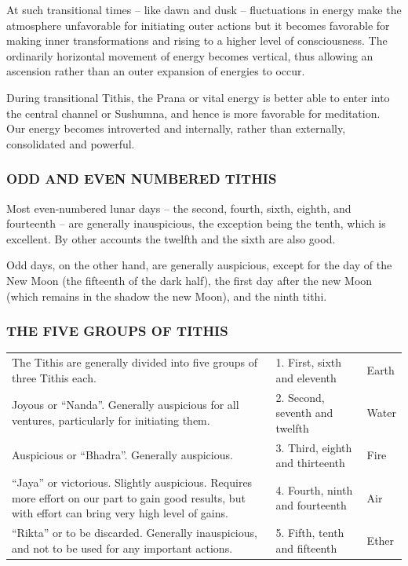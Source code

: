  

At such transitional times – like dawn and dusk – fluctuations in energy make the atmosphere unfavorable for initiating outer actions but it becomes favorable for making inner transformations and rising to a higher level of consciousness. The ordinarily horizontal movement of energy becomes vertical, thus allowing an ascension rather than an outer expansion of energies to occur.

 

During transitional Tithis, the Prana or vital energy is better able to enter into the central channel or Sushumna, and hence is more favorable for meditation. Our energy becomes introverted and internally, rather than externally, consolidated and powerful.

 

\subsubsection{ODD AND EVEN NUMBERED TITHIS}

Most even-numbered lunar days – the second, fourth, sixth, eighth, and fourteenth – are generally inauspicious, the exception being the tenth, which is excellent. By other accounts the twelfth and the sixth are also good.

 

Odd days, on the other hand, are generally auspicious, except for the day of the New Moon (the fifteenth of the dark half), the first day after the new Moon (which remains in the shadow the new Moon), and the ninth tithi.
 

\subsubsection{THE FIVE GROUPS OF TITHIS}

\begin{center}
\begin{tabular}{ l l l}

The Tithis are generally divided into five groups of three Tithis each.
&1.    First, sixth and eleventh
&Earth \\

Joyous or “Nanda”. Generally auspicious for all ventures, particularly for initiating them.
&2.    Second, seventh and twelfth
&Water \\

Auspicious or “Bhadra”. Generally auspicious.
&3.    Third, eighth and thirteenth
&Fire \\

“Jaya” or victorious. Slightly auspicious. Requires more effort on our part to gain good results, but with effort can bring very high level of gains.
&4.    Fourth, ninth and fourteenth
&Air \\

“Rikta” or to be discarded. Generally inauspicious, and not to be used for any important actions.
&5.    Fifth, tenth and fifteenth
&Ether \\
\end{tabular}
\end{center}

